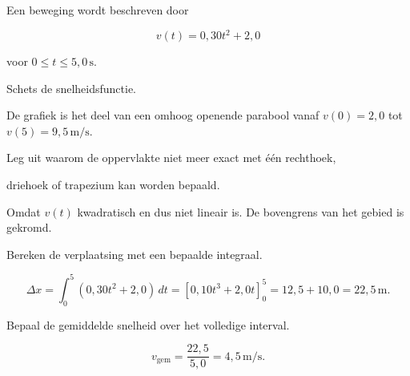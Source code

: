 \documentclass{ximera}
\begin{document}
\begin{oefening}{\oefU\ESS}

Een beweging wordt beschreven door

\[v(t)=0,30t^2+2,0\]

voor $0\leq t\leq5,0\,\mathrm{s}$.

\begin{question}

Schets de snelheidsfunctie.

\begin{oplossing}
De grafiek is het deel van een omhoog openende parabool vanaf \(v(0)=2,0\) tot \(v(5)=9,5\,\mathrm{m/s}\).
\end{oplossing}

\end{question}

\begin{question}

Leg uit waarom de oppervlakte niet meer exact met één rechthoek,

driehoek of trapezium kan worden bepaald.

\begin{oplossing}
Omdat \(v(t)\) kwadratisch en dus niet lineair is. De bovengrens van het gebied is gekromd.
\end{oplossing}

\end{question}

\begin{question}

Bereken de verplaatsing met een bepaalde integraal.

\begin{oplossing}
\[\Delta x=\int_0^5(0,30t^2+2,0)\,dt =\left[0,10t^3+2,0t\right]_0^5 =12,5+10,0=22,5\,\mathrm{m}.\]
\end{oplossing}

\end{question}

\begin{question}

Bepaal de gemiddelde snelheid over het volledige interval.

\begin{oplossing}
\[v_{\mathrm{gem}}=\frac{22,5}{5,0}=4,5\,\mathrm{m/s}.\]
\end{oplossing}

\end{question}

\end{oefening}
\end{document}
